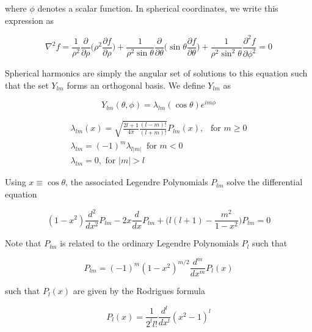\documentclass[12pt]{article}
\begin{document}
where $\phi$ denotes a scalar function. In spherical coordinates, we write this expression as 

\begin{equation}
\nabla^2 f=\frac{1}{\rho^2}\frac{\partial}{\partial\rho}\Bigg(\rho^2\frac{\partial f}{\partial\rho}\Bigg)+\frac{1}{\rho^2\sin\theta}\frac{\partial}{\partial\theta}\Bigg(\sin\theta\frac{\partial f}{\partial\theta}\Bigg)+\frac{1}{\rho^2\sin^2\theta}\frac{\partial^2 f}{\partial\phi^2}=0
\end{equation}

Spherical harmonics are simply the angular set of solutions to this equation such that the set $Y_{lm}$ forms an orthogonal basis. We define $Y_{lm}$ as

\begin{equation}
Y_{lm}(\theta, \phi)=\lambda_{lm}(\cos\theta)e^{im\phi}
\end{equation}

\begin{eqnarray*}
\lambda_{lm}(x)=\sqrt{\frac{2l+1}{4\pi}\frac{(l-m)!}{(l+m)!}}P_{lm}(x), \ \ \mbox{ for }m\geq0 \\
\lambda_{lm}=(-1)^{m}\lambda_{l|m|} \ \mbox{ for }m<0 \\
\lambda_{lm}=0, \mbox{ for } |m|>l
\end{eqnarray*}


Using $x\equiv\cos\theta$, the associated Legendre Polynomials $P_{lm}$ solve the differential equation

\begin{equation}
(1-x^2)\frac{d^2}{dx^2}P_{lm}-2x\frac{d}{dx}P_{lm}+\Bigg(l(l+1)-\frac{m^2}{1-x^2}\Bigg)P_{lm}=0
\end{equation}

Note that $P_{lm}$ is related to the ordinary Legendre Polynomials $P_l$ such that 

\begin{equation}
P_{lm}=(-1)^m(1-x^2)^{m/2}\frac{d^m}{dx^m}P_l(x)
\end{equation}

such that $P_l(x)$ are given by the Rodrigues formula

\begin{equation}
P_l(x)=\frac{1}{2^l l!}\frac{d^l}{dx^l}(x^2-1)^l
\end{equation}






\def\Discussion{
\setlength{\parskip}{0.3cm}\setlength{\parindent}{0.0cm}
     \bigskip\bigskip      {\Large {\bf Discussion}} \bigskip}
\def\speaker#1{{\bf #1:}\ }
\def\endDiscussion{}
\end{document}
